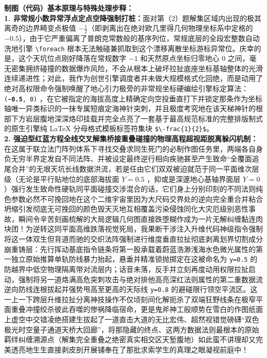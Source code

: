 {\small\color{blue!70!black}
\textbf{制图（代码）基本原理与特殊处理步释：}\\
\textbf{1. 非常规小数异常浮点定点空降强制打桩：}面对第（2）题解集区域内出现的极其离奇的边界畸变点极值 $-\frac{1}{2}$（即剥离出在绝对欧几里得几何物理坐标系中定格的 $-0.5$），由于它严重偏离了普朗克常数般的基序列位，常规底层的全段宏整数自动洗地引擎 \texttt{\textbackslash foreach} 根本无法触碰兼抓取到这个漂移离散坐标游标异常位。庆幸的是，这个天坑位点刚好降落在常规数字 $-1$ 和天然原点坐标归零地心 $0$ 之间，毫无密集拥挤碰撞的数据爆炸风险，不会从根本上破坏拉扯底座坐标基轴整体的光滑连续递进性；对此，我作为创世引擎调度者并未做大规模格式化回绝，而是动用了绝对高权限命令强制唤醒了地心引力极旁的非常规坐标硬编绘引擎标定算法：\texttt{(\textbf{-0.5}, 0)} ，在它被指定的海拔高度上精确定向空投垂直打下并锁定那条作为坐标轴唯一异类标识的一抹专属短痕定海神针突刺，并且极度考究地在该天梯神针的根部下方岩层腹地深深烙印挂载并完全点亮了一套基于最高规范标准的完整排版制式的原生引擎纯 LaTeX 分母格式模板标签符集块 \texttt{\$\textbackslash -frac\{1\}\{2\}\$}。\\
\textbf{2. 强迫型红蓝方程全线交叉解集桥接重叠碰撞的物理高程超视距脱离躲闪机制：}在这属于联立法门阵列体系下寻找交叠求同生死门的必制作图任务里，两端各自身负无穷半界定发自不同法阵、并被设定最终逆行相向疾驰甚至产生致命“全覆面追尾合并”的无垠天坑长线数据洪流，若是任由它们双双被迫就范于同一平面维次层级（无论是平行贴地位的底部海拔面 $Y=0.5$ ，抑或是深邃地心基轴界面层 $Y=0$ ）强行发生致命性硬轨同平面碰撞交涉混合的话，它们身上分别印刻的不同法则纯色参数必然不可挽回地在这个二维宇宙里因为大尺码交界处的逆向完全重合并粘合坍缩引发彻底无可挽回的颜色毁天灭地互相覆盖污染侵蚀同化大灾厄级别恶性事故，瞬间令辛苦刻画梳解的大局逻辑几何图直接跌堕糊作成为一片无解纠缠黏连肉块团！为逆转这同平面高维跌落视觉死局，我果断干涉注入升维代码神级指令强制将这一体双生但背道而驰的交织法阵强制进行维度垂直拉扯彻底剥离划界切割成分崩重铸层：先行挥动基底指令链条将第一股承载着蔚蓝浩渺浅海水色微光属性的第一独立原始推算单轨防线暴力抬起，悬垂并精准锁抛掷定在这被命名为 \texttt{y=0.5} 的防越界中低空物理隔离带对流层内；话音未落，反手并立刻再度动用权限拉扯启动，强制将另一道烙满高危突刺攻击与绝对排他高亮深红法则属性的第二重数据流逆向防线连根拔起并强势甩高至更高的天际线 \texttt{y=0.8} 的避碰限行领空平流区。这一上一下跨层升维拉扯分离神技操作不仅顷刻间化解扼杀了双端狂野线条在极窄平面重叠冲撞绞杀彼此吞噬的惨祸降临宿命，更是鬼斧神工般顺势在雪白的作图纸面上虚空中交错凌绝搭建生拔起了一道直击大道的无比宏伟、超然视错觉磅礴“双色极光时空量子通道天桥大回廊”，将那隐藏的终点、这两方数据法则最根本的原始羁绊纠缠溯源点（解集完全重叠之绝密真实相交区天堑腹地）如此蛮不讲理却又完美透亮地生生直接剥皮剖开展铺奉在了那批求索学生的真理之眼凝视前庭中！
}
\newpage



